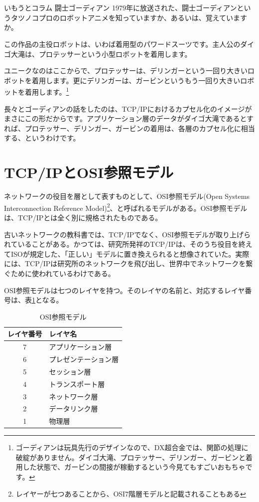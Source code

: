 \section*{}
\begin{itembox}[l]{いもうとコラム 闘士ゴーディアン}
1979年に放送された、闘士ゴーディアンというタツノコプロのロボットアニメを知っていますか、あるいは、覚えていますか。

この作品の主役ロボットは、いわば着用型のパワードスーツです。主人公のダイゴ大滝は、プロテッサーという小型ロボットを着用します。

ユニークなのはここからで、プロテッサーは、デリンガーという一回り大きいロボットを着用します。更にデリンガーは、ガービンというもう一回り大きいロボットを着用します。\footnote{ゴーディアンは玩具先行のデザインなので、DX超合金では、関節の処理に破綻がありません。ダイゴ大滝、プロテッサー、デリンガー、ガービンと着用した状態で、ガービンの間接が稼動するという今見てもすごいおもちゃです。}

長々とゴーディアンの話をしたのは、TCP/IPにおけるカプセル化のイメージがまさにこの形だからです。アプリケーション層のデータがダイゴ大滝であるとすれば、プロテッサー、デリンガー、ガービンの着用は、各層のカプセル化に相当する、というわけです。

\end{itembox}


\section{TCP/IPとOSI参照モデル}
ネットワークの役目を層として表すものとして、OSI参照モデル(Open Systems Interconnection Reference Model)\footnote{レイヤーが七つあることから、OSI7階層モデルと記載されることもある}、と呼ばれるモデルがある。OSI参照モデルは、TCP/IPとは全く別に規格されたものである。

古いネットワークの教科書では、TCP/IPでなく、OSI参照モデルが取り上げられていることがある。かつては、研究所発祥のTCP/IPは、そのうち役目を終えてISOが規定した、「正しい」モデルに置き換えられると想像されていた。実際には、TCP/IPは研究所のネットワークを飛び出し、世界中でネットワークを繋ぐために使われているわけである。

OSI参照モデルは七つのレイヤを持つ。そのレイヤの名前と、対応するレイヤ番号は、表\ref{osirm}となる。

\begin{table}[hbtp] 
\begin{center} \label{osirm}
	\begin{tabular}{cl} \toprule 
		レイヤ番号 & レイヤ名 \\ \midrule
		7 & アプリケーション層 \\
		6 & プレゼンテーション層 \\
		5 & セッション層 \\
		4 & トランスポート層 \\
		3 & ネットワーク層 \\
		2 & データリンク層 \\
		1 & 物理層 \\ \bottomrule
	\end{tabular}
\end{center} \caption{OSI参照モデル}
\end{table} 

